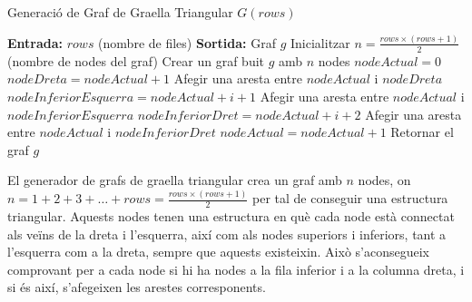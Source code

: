 \documentclass[a4paper]{article}
\begin{document}
	\begin{algorithm} [H]
		\caption{Generació de Graf de Graella Triangular $G(rows)$}
		\begin{algorithmic} [1]
			\Statex \textbf{Entrada:} $rows$ (nombre de files)
			\Statex \textbf{Sortida:} Graf $g$
			\Statex \vspace{-0.25em}
			\State Inicialitzar $n = \frac{rows \times (rows + 1)}{2}$ (nombre de nodes del graf)
			\State Crear un graf buit $g$ amb $n$ nodes
			\State $nodeActual = 0$
						\State $nodeDreta = nodeActual + 1$
						\State Afegir una aresta entre $nodeActual$ i $nodeDreta$
					\EndIf
						\State $nodeInferiorEsquerra = nodeActual + i + 1$
						\State Afegir una aresta entre $nodeActual$ i $nodeInferiorEsquerra$
						\State $nodeInferiorDret = nodeActual + i + 2$
						\State Afegir una aresta entre $nodeActual$ i $nodeInferiorDret$
					\EndIf
					\State $nodeActual = nodeActual + 1$
				\EndFor
			\EndFor
			\State Retornar el graf $g$
		\end{algorithmic}
	\end{algorithm}
	
	El generador de grafs de graella triangular crea un graf amb $n$ nodes, on $n = 1 + 2 + 3 + \ldots + rows = \frac{rows \times (rows + 1)}{2}$ per tal de conseguir una estructura triangular. Aquests nodes tenen una estructura en què cada node està connectat als veïns de la dreta i l'esquerra, així com als nodes superiors i inferiors, tant a l'esquerra com a la dreta, sempre que aquests existeixin. Això s'aconsegueix comprovant per a cada node si hi ha nodes a la fila inferior i a la columna dreta, i si és així, s'afegeixen les arestes corresponents. \\
\end{document}
